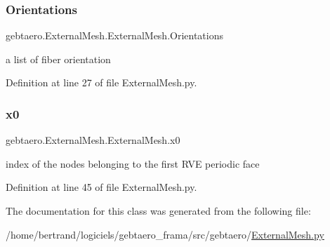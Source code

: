 \subsubsection{\texorpdfstring{Orientations}{Orientations}}
{\footnotesize\ttfamily gebtaero.\+External\+Mesh.\+External\+Mesh.\+Orientations}



a list of fiber orientation 



Definition at line 27 of file External\+Mesh.\+py.

\mbox{\label{classgebtaero_1_1_external_mesh_1_1_external_mesh_acaa3b125cb4f80848007b82426c14ffa}} 
\subsubsection{\texorpdfstring{x0}{x0}}
{\footnotesize\ttfamily gebtaero.\+External\+Mesh.\+External\+Mesh.\+x0}



index of the nodes belonging to the first R\+VE periodic face 



Definition at line 45 of file External\+Mesh.\+py.



The documentation for this class was generated from the following file\+:\begin{DoxyCompactItemize}
\item 
/home/bertrand/logiciels/gebtaero\+\_\+frama/src/gebtaero/\hyperlink{_external_mesh_8py}{External\+Mesh.\+py}\end{DoxyCompactItemize}
